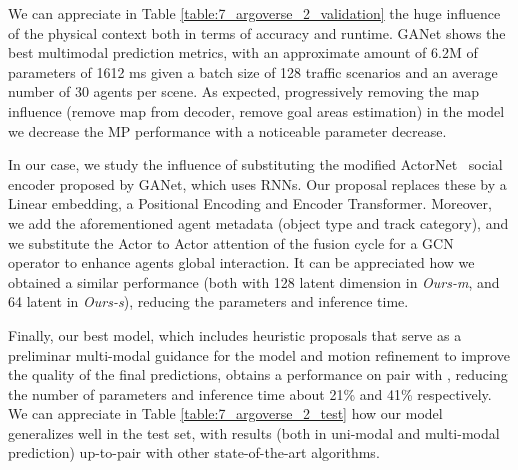 We can appreciate in Table \ref{table:7_argoverse_2_validation} the huge influence of the physical context both in terms of accuracy and runtime. GANet \cite{wang2022ganet} shows the best multimodal prediction metrics, with an approximate amount of 6.2M of parameters of 1612 ms given a batch size of 128 traffic scenarios and an average number of 30 agents per scene. As expected, progressively removing the map influence (remove map from decoder, remove goal areas estimation) in the model we decrease the MP performance with a noticeable parameter decrease. 


In our case, we study the influence of substituting the modified ActorNet~\cite{wang2022ganet, liang2020learning} social encoder proposed by GANet, which uses RNNs. Our proposal replaces these by a Linear embedding, a Positional Encoding and Encoder Transformer. Moreover, we add the aforementioned agent metadata (object type and track category), and we substitute the Actor to Actor attention of the fusion cycle for a GCN~\cite{schmidt2022crat} operator to enhance agents global interaction. 
%
It can be appreciated how we obtained a similar performance (both with 128 latent dimension in \textit{Ours-m}, and 64 latent in \textit{Ours-s}), reducing the parameters and inference time. 

Finally, our best model, which includes heuristic proposals that serve as a preliminar multi-modal guidance for the model and motion refinement to improve the quality of the final predictions, obtains a performance on pair with \cite{wang2022ganet}, reducing the number of parameters and inference time about 21\% and 41\% respectively. We can appreciate in Table \ref{table:7_argoverse_2_test} how our model generalizes well in the test set, with results (both in uni-modal and multi-modal prediction) up-to-pair with other state-of-the-art algorithms.

